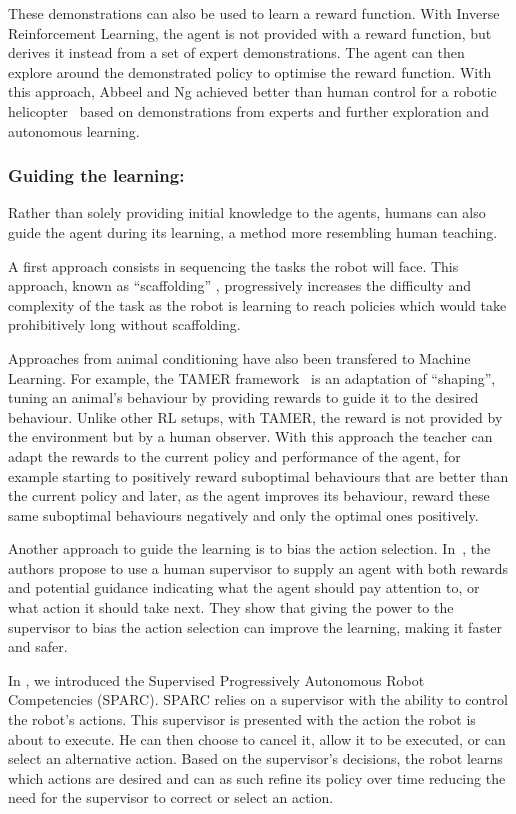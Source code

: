 \documentclass[letterpaper]{article} %
\begin{document}
These demonstrations can also be used to learn a reward function. With Inverse
Reinforcement Learning, the agent is not provided with a reward function, but
derives it instead from a set of expert demonstrations. The agent can then explore
around the demonstrated policy to optimise the reward function. With
this approach, Abbeel and Ng achieved better than human control for a robotic
helicopter~\cite{abbeel2004apprenticeship} based on demonstrations from experts
and further exploration and autonomous learning.

\subsubsection{Guiding the learning:}
Rather than solely providing initial knowledge
to the agents, humans can also guide the agent during its learning, a method more resembling human teaching. 

A first approach consists in sequencing the tasks the robot will face. 
This approach, known as ``scaffolding'' \cite{saunders2006teaching}, progressively
increases the difficulty and complexity of the task as the robot is learning
to reach policies which would take prohibitively long without scaffolding.

Approaches from animal conditioning have also been transfered to Machine Learning. 
For example, the TAMER framework~\cite{knox2009interactively} is an adaptation of ``shaping'',
tuning an animal's behaviour by providing rewards to guide it to the desired
behaviour. Unlike other RL setups, with TAMER, the
reward is not provided by the environment but by a human observer. With this
approach the teacher can adapt the 
rewards to the current policy and performance of the agent, for example starting to positively reward
 suboptimal behaviours that are better than the current policy and
later, as the agent improves its behaviour, reward these same suboptimal
behaviours negatively and only the optimal ones positively.

Another approach to guide the learning is to bias the action selection.
In~\cite{thomaz2008teachable}, the authors propose to use a human supervisor to
supply an agent with both rewards and potential guidance indicating what
the agent should pay attention to, or what action it should take next. They show that
giving the power to the supervisor to bias the action selection can improve the
learning, making it faster and safer.

In \cite{senft2015sparc}, we introduced the Supervised Progressively
Autonomous Robot Competencies (SPARC). SPARC relies on a supervisor with the
ability to control the robot's actions. This supervisor is presented with the
action the robot is about to execute. He can then choose to cancel it, allow it to be
executed, or can select an alternative action. Based on the supervisor's decisions,
the robot learns which actions are desired and can as such refine its policy over time
reducing the need for the supervisor to correct or select an action.
\end{document}
